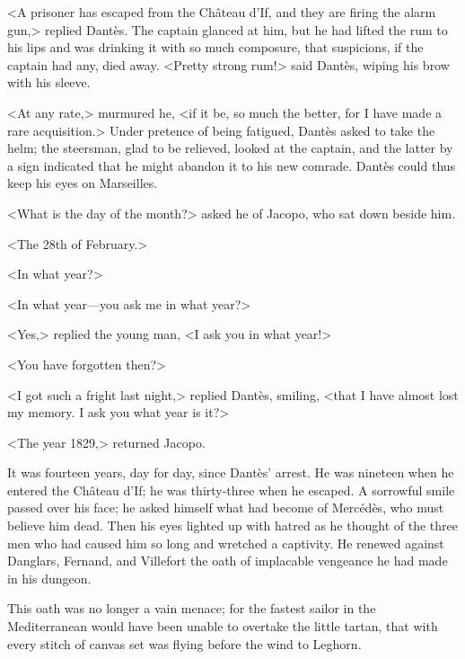  <A prisoner has escaped from the Château d'If, and they are firing the alarm gun,> replied Dantès. The captain glanced at him, but he had lifted the rum to his lips and was drinking it with so much composure, that suspicions, if the captain had any, died away.  <Pretty strong rum!> said Dantès, wiping his brow with his sleeve. 

 <At any rate,> murmured he, <if it be, so much the better, for I have made a rare acquisition.>  Under pretence of being fatigued, Dantès asked to take the helm; the steersman, glad to be relieved, looked at the captain, and the latter by a sign indicated that he might abandon it to his new comrade. Dantès could thus keep his eyes on Marseilles. 

 <What is the day of the month?> asked he of Jacopo, who sat down beside him. 

 <The 28th of February.> 

 <In what year?> 

 <In what year—you ask me in what year?> 

 <Yes,> replied the young man, <I ask you in what year!> 

 <You have forgotten then?> 

 <I got such a fright last night,> replied Dantès, smiling, <that I have almost lost my memory. I ask you what year is it?> 

 <The year 1829,> returned Jacopo. 

 It was fourteen years, day for day, since Dantès' arrest. He was nineteen when he entered the Château d'If; he was thirty-three when he escaped. A sorrowful smile passed over his face; he asked himself what had become of Mercédès, who must believe him dead. Then his eyes lighted up with hatred as he thought of the three men who had caused him so long and wretched a captivity. He renewed against Danglars, Fernand, and Villefort the oath of implacable vengeance he had made in his dungeon. 

 This oath was no longer a vain menace; for the fastest sailor in the Mediterranean would have been unable to overtake the little tartan, that with every stitch of canvas set was flying before the wind to Leghorn. 